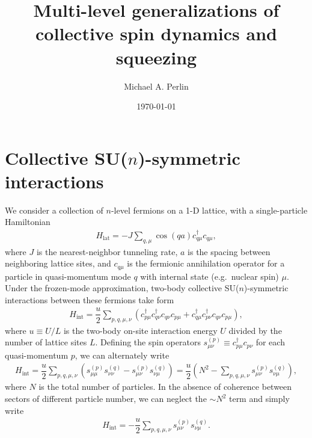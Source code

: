 \documentclass[nofootinbib,notitlepage,11pt]{revtex4-2}
\renewcommand{\t}{\text} %
\newcommand{\f}[2]{\dfrac{#1}{#2}} %
\newcommand{\p}[1]{\left(#1\right)} %
\newcommand{\1}{\mathds{1}}
\begin{document}
\thispagestyle{fancy}

\title{Multi-level generalizations of collective spin dynamics and
  squeezing}%
\author{Michael A. Perlin}%
\date{\today}

\maketitle

\tableofcontents

\section{Collective SU($n$)-symmetric interactions}
\label{sec:int}

We consider a collection of $n$-level fermions on a 1-D lattice, with
a single-particle Hamiltonian
\begin{align}
  H_{\t{lat}} = -J \sum_{q,\mu} \cos\p{qa} c_{q\mu}^\dag c_{q\mu},
  \label{eq:H_lat}
\end{align}
where $J$ is the nearest-neighbor tunneling rate, $a$ is the spacing
between neighboring lattice sites, and $c_{q\mu}$ is the fermionic
annihilation operator for a particle in quasi-momentum mode $q$ with
internal state (e.g.~nuclear spin) $\mu$.  Under the frozen-mode
approximation, two-body collective SU($n$)-symmetric interactions
between these fermions take form\cite{perlin2019effective}
\begin{align}
  H_{\t{int}} = \f{u}{2} \sum_{p,q,\mu,\nu}
  \p{c_{p\mu}^\dag c_{q\nu}^\dag c_{q\nu} c_{p\mu}
    + c_{q\mu}^\dag c_{p\nu}^\dag c_{q\nu} c_{p\mu}},
\end{align}
where $u\equiv U/L$ is the two-body on-site interaction energy $U$
divided by the number of lattice sites $L$.  Defining the spin
operators $s_{\mu\nu}^{(p)}\equiv c_{p\mu}^\dag c_{p\nu}$ for each
quasi-momentum $p$, we can alternately write
\begin{align}
  H_{\t{int}} = \f{u}{2} \sum_{p,q,\mu,\nu}
  \p{s_{\mu\mu}^{(p)} s_{\nu\nu}^{(q)} - s_{\mu\nu}^{(p)} s_{\nu\mu}^{(q)}}
  = \f{u}{2}\p{N^2 - \sum_{p,q,\mu,\nu} s_{\mu\nu}^{(p)} s_{\nu\mu}^{(q)}},
\end{align}
where $N$ is the total number of particles.  In the absence of
coherence between sectors of different particle number, we can neglect
the $\sim N^2$ term and simply write
\begin{align}
  H_{\t{int}}
  = - \f{u}{2} \sum_{p,q,\mu,\nu} s_{\mu\nu}^{(p)} s_{\nu\mu}^{(q)}.
\end{align}
\end{document}
